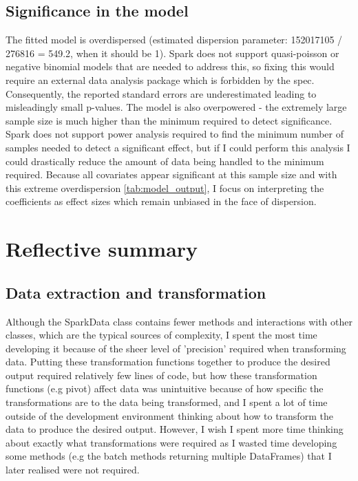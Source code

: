 \documentclass{article}
\begin{document}
    \subsection*{Significance in the model}
    The fitted model is overdispersed (estimated dispersion parameter: 152017105 / 276816 = 549.2, when it should be 1). Spark does not support quasi-poisson or negative binomial models that are needed to address this, so fixing this would require an external data analysis package which is forbidden by the spec. Consequently, the reported standard errors are underestimated leading to misleadingly small p-values. The model is also overpowered - the extremely large sample size is much higher than the minimum required to detect significance. Spark does not support power analysis required to find the minimum number of samples needed to detect a significant effect, but if I could perform this analysis I could drastically reduce the amount of data being handled to the minimum required. Because all covariates appear significant at this sample size and with this extreme overdispersion \ref{tab:model_output}, I focus on interpreting the coefficients as effect sizes which remain unbiased in the face of dispersion.

\section*{Reflective summary}
    \subsection*{Data extraction and transformation}
    Although the SparkData class contains fewer methods and interactions with other classes, which are the typical sources of complexity, I spent the most time developing it because of the sheer level of 'precision' required when transforming data. Putting these transformation functions together to produce the desired output required relatively few lines of code, but how these transformation functions (e.g pivot) affect data was unintuitive because of how specific the transformations are to the data being transformed, and I spent a lot of time outside of the development environment thinking about how to transform the data to produce the desired output. However, I wish I spent more time thinking about exactly what transformations were required as I wasted time developing some methods (e.g the batch methods returning multiple DataFrames) that I later realised were not required.
\end{document}
